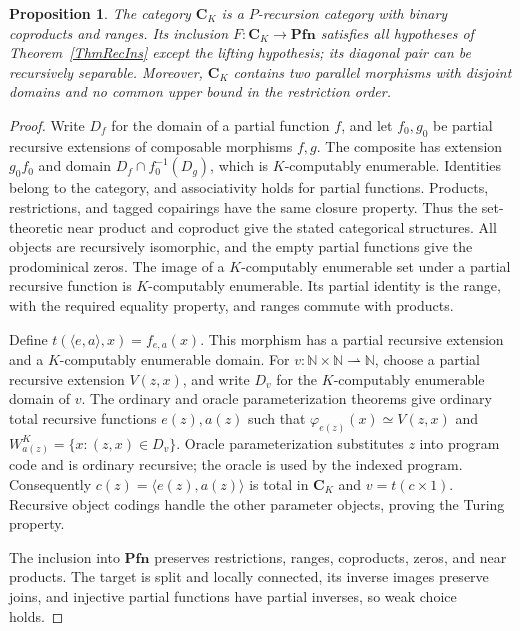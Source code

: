 \documentclass[letterpaper,10pt]{amsart}
\theoremstyle{plain}
\newtheorem{prop}[thm]{Proposition}
\theoremstyle{definition}
\begin{document}
\begin{prop}\label{PropCounterexample}
The category $\mathbf C_K$ is a $P$-recursion category with binary
coproducts and ranges. Its inclusion $F:\mathbf C_K\to\mathbf{Pfn}$
satisfies all hypotheses of Theorem~\ref{ThmRecIns} except the lifting
hypothesis; its diagonal pair can be recursively separable.
Moreover, $\mathbf C_K$ contains two parallel morphisms with disjoint
domains and no common upper bound in the restriction order.
\end{prop}
\begin{proof}
Write $D_f$ for the domain of a partial function $f$, and let $f_0,g_0$
be partial recursive extensions of composable morphisms $f,g$.
The composite has extension $g_0f_0$ and domain
$D_f\cap f_0^{-1}(D_g)$, which is $K$-computably enumerable.
Identities belong to the category, and associativity holds for partial
functions. Products, restrictions, and tagged copairings have the same
closure property. Thus the set-theoretic near product and coproduct give
the stated categorical structures. All objects are recursively isomorphic,
and the empty partial functions give the prodominical zeros.
The image of a $K$-computably enumerable set under a partial recursive
function is $K$-computably enumerable. Its partial identity is the range,
with the required equality property, and ranges commute with products.

Define $t(\langle e,a\rangle,x)=f_{e,a}(x)$. This morphism has a
partial recursive extension and a $K$-computably enumerable domain.
For $v:\mathbb N\times\mathbb N\rightharpoonup\mathbb N$, choose a
partial recursive extension $V(z,x)$, and write $D_v$ for the
$K$-computably enumerable domain of $v$. The ordinary and oracle
parameterization theorems \cite{MR90d:03072} give
ordinary total recursive functions $e(z),a(z)$ such that
$\varphi_{e(z)}(x)\simeq V(z,x)$ and
$W_{a(z)}^K=\{x:(z,x)\in D_v\}$.
Oracle parameterization substitutes $z$ into program code and is
ordinary recursive; the oracle is used by the indexed program.
Consequently $c(z)=\langle e(z),a(z)\rangle$ is total in $\mathbf C_K$
and $v=t(c\times1)$. Recursive object codings handle the other
parameter objects, proving the Turing property.

The inclusion into $\mathbf{Pfn}$ preserves restrictions, ranges,
coproducts, zeros, and near products. The target is split and locally
connected, its inverse images preserve joins, and injective partial
functions have partial inverses, so weak choice holds.


\end{proof}
\end{document}
